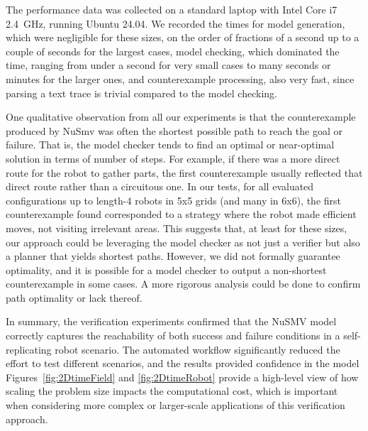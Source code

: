 The performance data was collected on a standard laptop with Intel Core i7 
2.4 GHz, running Ubuntu 24.04. We recorded the times for model generation,
which were negligible for these sizes, on the order of fractions of 
a second up to a couple of seconds for the largest cases, model checking,
which dominated the time, ranging from under a second for very small 
cases to many seconds or minutes for the larger ones, and counterexample processing,
also very fast, since parsing a text trace is trivial compared to 
the model checking. 

One qualitative observation from all our experiments is that the counterexample 
produced by NuSmv was often the shortest possible path to reach the 
goal or failure. That is, the model checker tends to find an optimal or 
near-optimal solution in terms of number of steps.
For example, if there was a more 
direct route for the robot to gather parts, the first counterexample usually 
reflected that direct route rather than a circuitous one. In our tests,
for all evaluated configurations up to length-4 robots in 5x5 grids 
(and many in 6x6), the first counterexample found corresponded to a 
strategy where the robot made efficient moves, not visiting irrelevant areas.
This suggests that, at least for these sizes, our approach could be 
leveraging the model checker as not just a verifier but also a planner that 
yields shortest paths.
However, we did not formally guarantee optimality, 
and it is possible for a model checker to output a non-shortest counterexample 
in some cases.
A more rigorous analysis 
could be done to confirm path optimality or lack thereof. 

In summary, the verification experiments confirmed that the NuSMV model 
correctly captures the reachability of both success and failure conditions 
in a self-replicating robot scenario. The automated workflow significantly reduced 
the effort to test different scenarios, and the results provided  
confidence in the model 
Figures \ref{fig:2DtimeField} and \ref{fig:2DtimeRobot} provide a 
high-level view of how scaling the problem size impacts the computational cost,
which is important when considering more complex or larger-scale applications 
of this verification approach.


